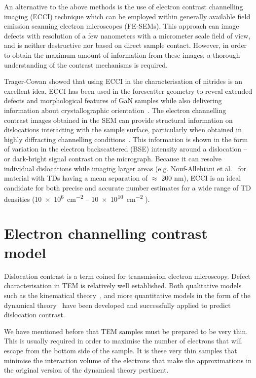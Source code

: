 An alternative to the above methods is the use of electron contrast channelling imaging (ECCI) technique which can be employed within generally available field emission scanning electron microscopes (FE-SEMs). This approach can image defects with resolution of a few nanometers with a micrometer scale field of view, and is neither destructive nor based on direct sample contact. However, in order to obtain the maximum amount of information from these images, a thorough understanding of the contrast mechanisms is required.

Trager-Cowan \etal\cite{Carol} showed that using ECCI in the characterisation of nitrides is an excellent idea. ECCI has been used in the forescatter geometry to reveal extended defects and
morphological features of GaN samples while also delivering information about crystallographic orientation~\cite{Picard}. The electron channelling contrast images obtained in the SEM can provide structural information on dislocations  interacting with the sample surface, particularly when obtained in highly diffracting channelling conditions~\cite{Naresh}. This information is shown in the form of variation in the electron backscattered (BSE) intensity around a dislocation -- or dark-bright signal contrast on the micrograph. Because it can resolve individual dislocations while imaging larger areas (e.g. Nouf-Allehiani et al.~\cite{Nouf} for material with TDs having a mean separation of $\approx$ 200 nm), ECCI is an ideal candidate for both precise and accurate number estimates for a wide range of TD densities (\SI{10e6}{\centi \metre^{-2}} -- \SI{10e10}{\centi \metre^{-2}} ).




 \section{Electron channelling contrast model}

Dislocation contrast is a term coined for transmission electron microscopy. Defect characterisation in TEM is relatively well established. Both qualitative models such as the kinematical theory~\cite{Hirsch60}, and more quantitative models in the form of the dynamical theory~\cite{Howie61,Clarke71,Spencer72} have been developed and successfully applied to predict dislocation contrast.

We have mentioned before that TEM samples must be prepared to be very thin. This is usually required in order to maximise the number of electrons that will escape from the bottom side of the sample. It is these very thin samples that minimise the interaction volume of the electrons that make the approximations in the original version of the dynamical theory pertinent. 

